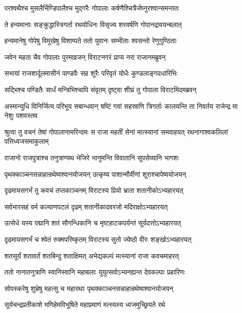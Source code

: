 \twolineshloka
{परश्वथैश्च मुसलैर्भिण्डिपालैश्च मुद्गरैः}
{गोपालाः कर्षणैश्चित्रैर्जघ्नुरश्वान्समन्ततः}


\twolineshloka
{ते हन्यमानाः सङ्क्रुद्धास्त्रिगर्ता रथयोधिनः}
{विसृज्य शरवर्षणि गोपानद्रावयन्बलात्}


\twolineshloka
{हन्यमानेषु गोपेषु विमुखेषु विशाम्पते}
{ततो युवानः सम्भीताः श्वसन्तो रेणुगुण्ठिताः}


\twolineshloka
{जवेन महता चैव गोपालाः पुरमाव्रजन्}
{विराटनगरं प्राप्य नरा राजानमब्रुवन्}


\twolineshloka
{सभायां राजशार्दूलमासीनं पाण्डवैः सह}
{शूरैः परिवृतं योधैः कुण्डलाङ्गदधारिभिः}


\twolineshloka
{सद्भिश्च पण्डितैः सार्धं मन्त्रिभिश्चापि संवृतम्}
{दृष्ट्वा शीघ्रं तु गोपाला विराटमिदमब्रवन्}


\threelineshloka
{अस्मान्युधि विनिर्जित्य परिभूय सबान्धवान्}
{षष्टिं गवां सहस्राणि त्रिगर्ताः कालयन्ति}
{ता निवर्तय राजेन्द्र मा नेशुः पशवस्तव}



\threelineshloka
{श्रुत्वा तु वचनं तेषां गोपालानामरिन्दमः}
{स राजा महतीं सेनां मात्स्यानां समवाहयत्}
{रथनागाश्वकलिलां पत्तिध्वजसमाकुलाम्}


\twolineshloka
{राजानो राजपुत्राश्च तनुत्राण्यथ भेजिरे}
{भानुमन्ति विवातानि सूपसेव्यानि भागशः}


\twolineshloka
{पृथक्काञ्चनसन्नाहान्रथेष्वश्वानयोजयन्}
{उत्कृष्य पाशान्मौर्वीणां शूराश्चापेष्वयोजयन्}


\twolineshloka
{दृढमायसगर्भं तु कवचं तप्तकाञ्चनम्}
{विराटस्य प्रियो भ्राता शतानीकोऽभ्यहारयत्}


\twolineshloka
{सर्वभारसहं वर्म कल्याणपटलं दृढम्}
{शतानीकादवरजो मदिराक्षोऽभ्यहारयत्}


\twolineshloka
{उत्सेधे यस्य पद्मानि शतं सौगन्धिकानि च}
{मृष्टहाटकपर्यन्तं सूर्यदत्तोऽभ्यहारयत्}


\twolineshloka
{दृढमायसगर्भं च श्वेतं रुक्मपरिष्कृतम्}
{विराटस्य सुतो ज्येष्ठो वीरः शङ्खोऽभ्यहारयत्}


\twolineshloka
{शतसूर्यं शतावर्तं शतबिन्दु शताक्षिमत्}
{अभेद्यकल्पं मत्स्यानां राजा कवचमाहरत्}


\twolineshloka
{ततो नानातनुत्राणि स्वानिस्वानि महाबलाः}
{युयुत्सवोऽभ्यनह्यन्त देवकल्पाः प्रहारिणः}


\twolineshloka
{सोपस्करेषु शुभ्रेषु महत्सु च महारथाः}
{पृथक्काञ्चनसन्नाहान्रथेष्वश्वानयोजयन्}


\twolineshloka
{सूर्यचन्द्रप्रतीकाशे मणिहेमविभूषिते}
{महाप्रमाणं मत्स्यस्य ध्वजमुच्छ्रियते रथे}


